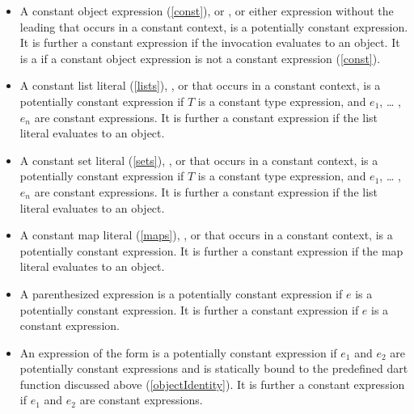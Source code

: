 \documentclass[makeidx]{article}
\begin{document}
{\begin{itemize}
\item
  A constant object expression (\ref{const}),
   or
  ,
  or either expression without the leading \CONST{} that occurs in
  a constant context,
  is a potentially constant expression.
  It is further a constant expression if the invocation evaluates to an object.
  It is a  if a constant object expression is
  not a constant expression (\ref{const}).

\item
  A constant list literal (\ref{lists}),
  , or
  that occurs in a constant context,
  is a potentially constant expression if $T$ is a constant type expression,
  and $e_1$, \ldots{} , $e_n$ are constant expressions.
  It is further a constant expression
  if the list literal evaluates to an object.

\item
  A constant set literal (\ref{sets}),
  , or
  that occurs in a constant context,
  is a potentially constant expression
  if $T$ is a constant type expression,
  and $e_1$, \ldots{} , $e_n$ are constant expressions.
  It is further a constant expression
  if the list literal evaluates to an object.

\item
  A constant map literal (\ref{maps}),
  , or
  that occurs in a constant context,
  is a potentially constant expression.
  It is further a constant expression
  if the map literal evaluates to an object.

\item
  A parenthesized expression  is
  a potentially constant expression
  if $e$ is a potentially constant expression.
  It is further a constant expression if $e$ is a constant expression.

\item
  An expression of the form  is
  a potentially constant expression
  if $e_1$ and $e_2$ are potentially constant expressions
  and  is statically bound to
  the predefined dart function  discussed above
  (\ref{objectIdentity}).
  It is further a constant expression
  if $e_1$ and $e_2$ are constant expressions.


\end{itemize}}
\end{document}
